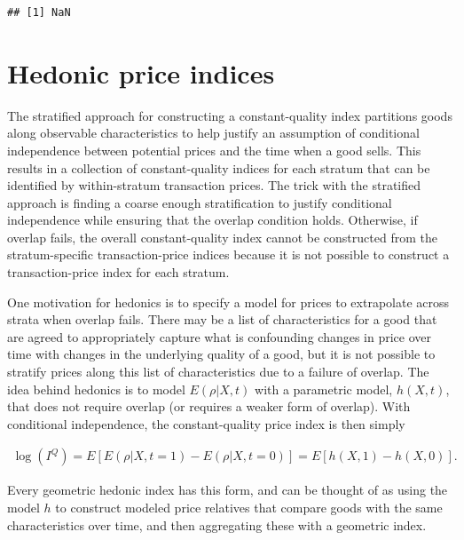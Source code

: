 \documentclass[]{article}
\begin{document}
\begin{verbatim}
## [1] NaN
\end{verbatim}

\hypertarget{hedonic-price-indices}{%
\section{Hedonic price indices}\label{hedonic-price-indices}}

The stratified approach for constructing a constant-quality index partitions goods along observable characteristics to help justify an assumption of conditional independence between potential prices and the time when a good sells. This results in a collection of constant-quality indices for each stratum that can be identified by within-stratum transaction prices. The trick with the stratified approach is finding a coarse enough stratification to justify conditional independence while ensuring that the overlap condition holds. Otherwise, if overlap fails, the overall constant-quality index cannot be constructed from the stratum-specific transaction-price indices because it is not possible to construct a transaction-price index for each stratum.

One motivation for hedonics is to specify a model for prices to extrapolate across strata when overlap fails. There may be a list of characteristics for a good that are agreed to appropriately capture what is confounding changes in price over time with changes in the underlying quality of a good, but it is not possible to stratify prices along this list of characteristics due to a failure of overlap. The idea behind hedonics is to model \(E(\rho | X, t)\) with a parametric model, \(h(X, t)\), that does not require overlap (or requires a weaker form of overlap). With conditional independence, the constant-quality price index is then simply

\begin{align*}
\log(I^{Q}) = E[E(\rho | X, t = 1) - E(\rho | X, t = 0)] = E[h(X, 1) - h(X, 0)].
\end{align*}

Every geometric hedonic index has this form, and can be thought of as using the model \(h\) to construct modeled price relatives that compare goods with the same characteristics over time, and then aggregating these with a geometric index.
\end{document}

